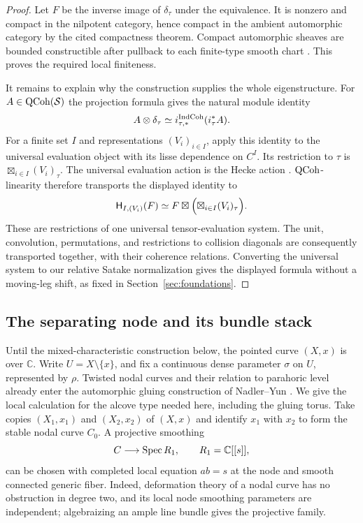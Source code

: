 \begin{proof}
Let $F$ be the inverse image of $\delta_\tau$ under the equivalence.
It is nonzero and compact in the nilpotent category, hence compact in
the ambient automorphic category by the cited compactness theorem.
Compact automorphic sheaves are bounded constructible after pullback
to each finite-type smooth chart
\cite[Appendix~F, Section~F.2.2]{AGKRRV}.  This proves the required local
finiteness.

It remains to explain why the construction supplies the whole
eigenstructure.  For $A\in\operatorname{QCoh}(\mathcal S)$ the projection formula gives
the natural module identity
\[
 A\otimes\delta_\tau
 \simeq i_{\tau,*}^{\operatorname{IndCoh}}(i_\tau^*A).
\]
For a finite set $I$ and representations $(V_i)_{i\in I}$, apply this
identity to the universal evaluation object with its lisse dependence
on $C^I$.  Its restriction to $\tau$ is
$\boxtimes_{i\in I}(V_i)_\tau$.  The universal evaluation action is the
Hecke action \cite[Main Theorem~14.3.2 and Section~14.3.3]{AGKRRV}.
$\operatorname{QCoh}$-linearity therefore transports the displayed identity to
\[
 \mathsf H_{I,(V_i)}(F)
 \simeq F\boxtimes\Bigl(\boxtimes_{i\in I}(V_i)_\tau\Bigr).
\]
These are restrictions of one universal tensor-evaluation system.
The unit, convolution, permutations, and restrictions to collision
diagonals are consequently transported together, with their coherence
relations.  Converting the universal system to our relative Satake
normalization gives the displayed formula without a moving-leg shift,
as fixed in Section~\ref{sec:foundations}.
\end{proof}

\subsection{The separating node and its bundle stack}

Until the mixed-characteristic construction below, the pointed curve
$(X,x)$ is over $\mathbb C$.  Write $U=X\setminus\{x\}$, and fix a
continuous dense parameter $\sigma$ on $U$, represented by $\rho$.
Twisted nodal curves and
their relation to parahoric level already enter the automorphic gluing
construction of Nadler--Yun
\cite[Section~2.3, Proposition~3.1.5, and Lemma~3.2.3]{NYAutomorphicGluing}.
We give the local calculation for the alcove type needed here, including
the gluing torus.  Take copies $(X_1,x_1)$
and $(X_2,x_2)$ of $(X,x)$ and identify $x_1$ with $x_2$ to form the
stable nodal curve $C_0$.  A projective smoothing
\[
 C\longrightarrow\operatorname{Spec} R_1,\qquad R_1=\mathbb C[[s]],
\]
can be chosen with completed local equation $ab=s$ at the node and
smooth connected generic fiber.  Indeed, deformation theory of a
nodal curve has no obstruction in degree two, and its local node
smoothing parameters are independent; algebraizing an ample line
bundle gives the projective family.


